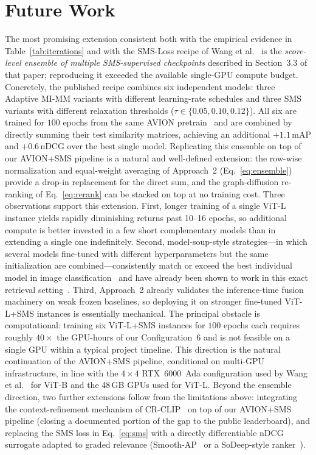 \section{Future Work}
\label{sec:future}

The most promising extension consistent both with the empirical evidence in Table~\ref{tab:iterations} and with the SMS-Loss recipe of Wang et al.~\cite{wang2024symmetricmultisimilaritylossepickitchens100} is the \emph{score-level ensemble of multiple SMS-supervised checkpoints} described in Section~3.3 of that paper; reproducing it exceeded the available single-GPU compute budget. Concretely, the published recipe combines six independent models: three Adaptive MI-MM variants with different learning-rate schedules and three SMS variants with different relaxation thresholds ($\tau \in \{0.05, 0.10, 0.12\}$). All six are trained for $100$ epochs from the same AVION pretrain~\cite{zhao2023avion} and are combined by directly summing their test similarity matrices, achieving an additional $+1.1$\,mAP and $+0.6$\,nDCG over the best single model. Replicating this ensemble on top of our AVION+SMS pipeline is a natural and well-defined extension: the row-wise normalization and equal-weight averaging of Approach~2 (Eq.~\eqref{eq:ensemble}) provide a drop-in replacement for the direct sum, and the graph-diffusion re-ranking of Eq.~\eqref{eq:rerank} can be stacked on top at no training cost. Three observations support this extension. First, longer training of a single ViT-L instance yields rapidly diminishing returns past 10--16 epochs, so additional compute is better invested in a few short complementary models than in extending a single one indefinitely. Second, model-soup-style strategies---in which several models fine-tuned with different hyperparameters but the same initialization are combined---consistently match or exceed the best individual model in image classification~\cite{wortsman2022modelsoups} and have already been shown to work in this exact retrieval setting~\cite{wang2024symmetricmultisimilaritylossepickitchens100}. Third, Approach~2 already validates the inference-time fusion machinery on weak frozen baselines, so deploying it on stronger fine-tuned ViT-L+SMS instances is essentially mechanical. The principal obstacle is computational: training six ViT-L+SMS instances for $100$ epochs each requires roughly $40\times$ the GPU-hours of our Configuration~6 and is not feasible on a single GPU within a typical project timeline. This direction is the natural continuation of the AVION+SMS pipeline, conditional on multi-GPU infrastructure, in line with the $4\times 4$ RTX~6000~Ada configuration used by Wang et al.~\cite{wang2024symmetricmultisimilaritylossepickitchens100} for ViT-B and the 48\,GB GPUs used for ViT-L. Beyond the ensemble direction, two further extensions follow from the limitations above: integrating the context-refinement mechanism of CR-CLIP~\cite{he2025crclip} on top of our AVION+SMS pipeline (closing a documented portion of the gap to the public leaderboard), and replacing the SMS loss in Eq.~\eqref{eq:sms} with a directly differentiable nDCG surrogate adapted to graded relevance (Smooth-AP~\cite{brown2020smoothap} or a SoDeep-style ranker~\cite{engilberge2019sodeep}).
